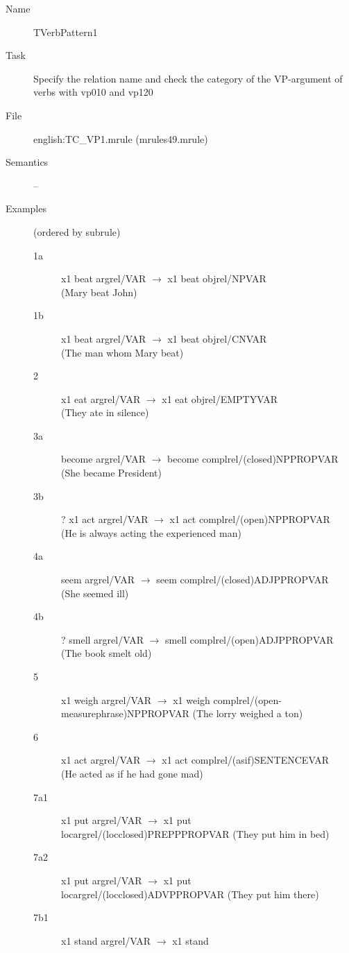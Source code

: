 \begin{description}
\vspace{1 cm}
\begin{description}
\item[Name] TVerbPattern1
\item[Task] Specify the relation name and check the category of the VP-argument of 
verbs with vp010 and vp120
\item[File] english:TC\_VP1.mrule (mrules49.mrule)
\item[Semantics] --
\item[Examples] (ordered by subrule)
\begin{description}
  \item[1a] x1 beat argrel/VAR $\rightarrow$ x1 beat objrel/NPVAR \\
(Mary beat John)
  \item[1b] x1 beat argrel/VAR $\rightarrow$ x1 beat objrel/CNVAR \\
(The man whom Mary beat)
  \item[2] x1 eat argrel/VAR $\rightarrow$ x1 eat objrel/EMPTYVAR \\
(They ate in silence)
  \item[3a] become argrel/VAR $\rightarrow$ become complrel/(closed)NPPROPVAR
 \\
(She became President)
  \item[3b] ? x1 act argrel/VAR $\rightarrow$ x1 act complrel/(open)NPPROPVAR
 \\
(He is always acting the experienced man)
  \item[4a] seem argrel/VAR $\rightarrow$ seem complrel/(closed)ADJPPROPVAR 
\\
(She seemed ill)
  \item[4b] ? smell argrel/VAR $\rightarrow$ smell complrel/(open)ADJPPROPVAR
 \\
(The book smelt old)
  \item[5] x1 weigh argrel/VAR $\rightarrow$ x1 weigh 
complrel/(open-measurephrase)NPPROPVAR
(The lorry weighed a ton)
  \item[6] x1 act argrel/VAR $\rightarrow$ x1 act complrel/(asif)SENTENCEVAR
 \\
(He acted as if he had gone mad)
  \item[7a1] x1 put argrel/VAR $\rightarrow$ x1 put 
locargrel/(locclosed)PREPPPROPVAR 
(They put him in bed)
  \item[7a2] x1 put argrel/VAR $\rightarrow$ x1 put 
locargrel/(locclosed)ADVPPROPVAR 
(They put him there)
  \item[7b1] x1 stand argrel/VAR $\rightarrow$ x1 stand

\end{description}
\end{description}
\end{description}
